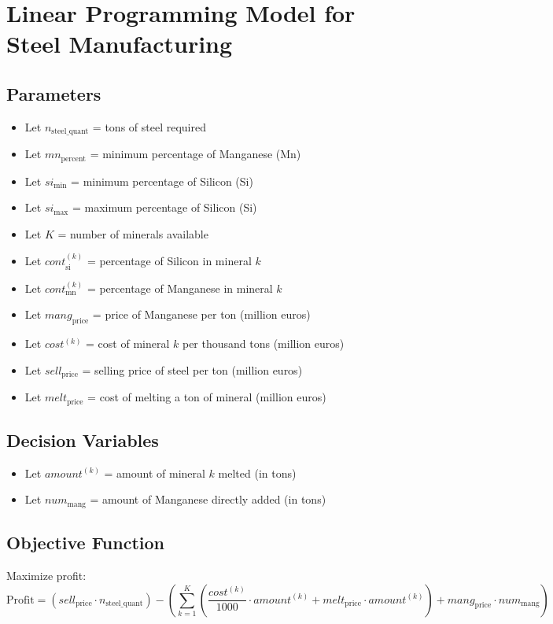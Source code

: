 \documentclass{article}
\begin{document}
\section*{Linear Programming Model for Steel Manufacturing}

\subsection*{Parameters}
\begin{itemize}
    \item Let \( n_{\text{steel\_quant}} \) = tons of steel required
    \item Let \( mn_{\text{percent}} \) = minimum percentage of Manganese (Mn)
    \item Let \( si_{\text{min}} \) = minimum percentage of Silicon (Si)
    \item Let \( si_{\text{max}} \) = maximum percentage of Silicon (Si)
    \item Let \( K \) = number of minerals available
    \item Let \( cont_{\text{si}}^{(k)} \) = percentage of Silicon in mineral \( k \)
    \item Let \( cont_{\text{mn}}^{(k)} \) = percentage of Manganese in mineral \( k \)
    \item Let \( mang_{\text{price}} \) = price of Manganese per ton (million euros)
    \item Let \( cost^{(k)} \) = cost of mineral \( k \) per thousand tons (million euros)
    \item Let \( sell_{\text{price}} \) = selling price of steel per ton (million euros)
    \item Let \( melt_{\text{price}} \) = cost of melting a ton of mineral (million euros)
\end{itemize}

\subsection*{Decision Variables}
\begin{itemize}
    \item Let \( amount^{(k)} \) = amount of mineral \( k \) melted (in tons)
    \item Let \( num_{\text{mang}} \) = amount of Manganese directly added (in tons)
\end{itemize}

\subsection*{Objective Function}
Maximize profit:
\[
\text{Profit} = (sell_{\text{price}} \cdot n_{\text{steel\_quant}}) - \left( \sum_{k=1}^{K} \left( \frac{cost^{(k)}}{1000} \cdot amount^{(k)} + melt_{\text{price}} \cdot amount^{(k)} \right) + mang_{\text{price}} \cdot num_{\text{mang}} \right)
\]
\end{document}
